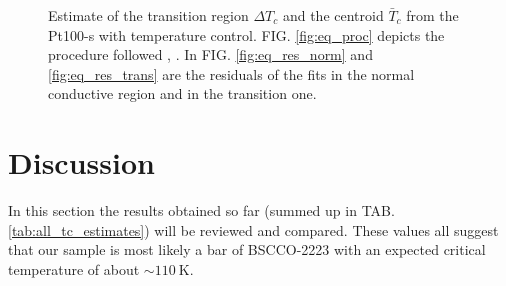 \documentclass[rmp,10pt,onecolumn,fleqn,notitlepage]{revtex4-1}
\begin{document}
\begin{figure}[h!]
\hfill
\begin{minipage}[]{0.49\linewidth}
\centering
{}
\end{minipage}
\label{fig:equilibrium_estimate}
\caption{Estimate of the transition region $\Delta T_c$ and the centroid $\bar{T}_c$ from the Pt100-s with temperature control.
FIG. \ref{fig:eq_proc} depicts the procedure followed \cite{metodo_tc}, \cite{HTC_springer}. In FIG. \ref{fig:eq_res_norm} and \ref{fig:eq_res_trans} are the residuals of the fits in the normal conductive region and in the transition one.}
\end{figure}


 

\pagebreak

\section{Discussion}
\label{sec:discussion}

In this section the results obtained so far (summed up in TAB. \ref{tab:all_tc_estimates}) will be reviewed and compared. These values all suggest that our sample is most likely a bar of BSCCO-2223 with an expected critical temperature of about $\sim \SI{110}{\kelvin}$.
\end{document}
